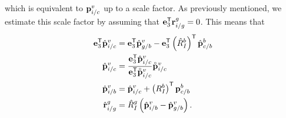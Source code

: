 which is equivalent to $\vect{p}_{i/c}^v$ up to a scale factor. As previously
mentioned, we estimate this scale factor by assuming that $\e_3^\transpose
\vect{r}_{i/g}^g = 0$. This means that
\begin{align}
  \e_3^\transpose \hat{\vect{p}}_{i/c}^v &= \e_3^\transpose \hat{\vect{p}}_{g/b}^v -
  \e_3^\transpose \left( \hat{R}_I^b \right)^\transpose \hat{\vect{p}}_{c/b}^b
  \\
  \hat{\vect{p}}_{i/c}^v &= \frac{\e_3^\transpose
  \hat{\vect{p}}_{i/c}^v}{\e_3^\transpose \scaled{\vect{p}}_{i/c}^v} \scaled{\vect{p}}_{i/c}^v
  \\
    \hat{\vect{p}}_{i/b}^v &= \hat{\vect{p}}_{i/c}^v + \left( R_I^b \right)^\transpose \vect{p}_{c/b}^b \\
    \hat{\vect{r}}_{i/g}^g &= \hat{R}_I^g \left( \hat{\vect{p}}_{i/b}^v -
    \hat{\vect{p}}_{g/b}^v \right).
\end{align}

